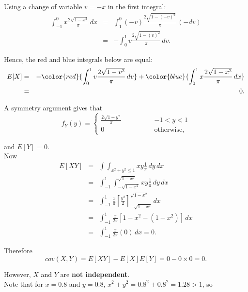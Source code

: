\documentclass[
]{book}
\begin{document}
Using a change of variable \(v=-x\) in the first integral:\\

\begin{eqnarray*}
 \int_{-1}^0 x  \frac{2 \sqrt{1- x^2}}{\pi} \, dx &=& \int_1^0 (-v) \frac{2 \sqrt{1- (-v)^2}}{\pi} \, (-dv) \\
 &=& - \int_0^1 v \frac{2 \sqrt{1- (v)^2}}{\pi} \, dv.
\end{eqnarray*}

Hence, the red and blue integrals below are equal:\\

\begin{eqnarray*}
E[X] &=&  - \color{red}{\int_0^1 v \frac{2 \sqrt{1- v^2}}{\pi} \, dv} + \color{blue}{\int_0^1 x  \frac{2 \sqrt{1- x^2}}{\pi} \, dx} \nonumber \\
&=& 0. 
\end{eqnarray*}

A symmetry argument gives that\\

\[ f_Y (y) = \left\{ \begin{array}{ll}  \frac{2 \sqrt{1- y^2}}{\pi} \qquad \qquad & -1 < y < 1 \\ 0 & \mbox{otherwise}, \end{array} \right. \]

and \(E[Y]=0\).\\
Now\\

\begin{eqnarray*}
E[XY]&=& \int \int_{x^2+y^2 \leq 1} xy \frac{1}{\pi} \, dy \, dx \\
&=& \int_{-1}^1 \int_{-\sqrt{1-x^2}}^{\sqrt{1-x^2}} xy \frac{1}{\pi} \, dy \, dx \\  %
&=& \int_{-1}^1 \frac{x}{\pi} \left[ \frac{y^2}{2} \right]_{-\sqrt{1-x^2}}^{\sqrt{1-x^2}} \, dx \\
&=& \int_{-1}^1 \frac{x}{2\pi} \left[ 1-x^2 - (1-x^2)\right] \, dx \\
&=&  \int_{-1}^1 \frac{x}{2\pi} (0) \, dx =0. \end{eqnarray*}

Therefore\\

\[ cov (X,Y) = E[XY] - E[X] E[Y] = 0 - 0\times 0 =0. \]

However, \(X\) and \(Y\) are \textbf{not independent}.\\
Note that for \(x=0.8\) and \(y=0.8\), \(x^2 + y^2 = 0.8^2 + 0.8^2 = 1.28 >1\), so\\
\end{document}
